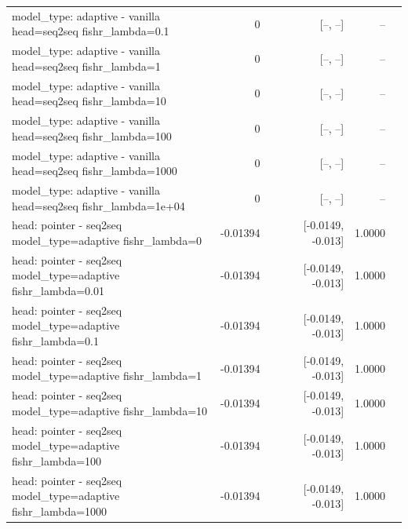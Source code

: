 \documentclass[10pt]{article}
\makeatletter
\newcommand{\stackcell}[1]{\begin{tabular}[t]{@{}l@{}}#1\end{tabular}}
\makeatother
\begin{document}
{\begin{longtable}{lrrrl}
\stackcell{model\_type: adaptive - vanilla\\\footnotesize head=seq2seq fishr\_lambda=0.1 } & 0 & [--, --] & -- & \\
\stackcell{model\_type: adaptive - vanilla\\\footnotesize head=seq2seq fishr\_lambda=1 } & 0 & [--, --] & -- & \\
\stackcell{model\_type: adaptive - vanilla\\\footnotesize head=seq2seq fishr\_lambda=10 } & 0 & [--, --] & -- & \\
\stackcell{model\_type: adaptive - vanilla\\\footnotesize head=seq2seq fishr\_lambda=100 } & 0 & [--, --] & -- & \\
\stackcell{model\_type: adaptive - vanilla\\\footnotesize head=seq2seq fishr\_lambda=1000 } & 0 & [--, --] & -- & \\
\stackcell{model\_type: adaptive - vanilla\\\footnotesize head=seq2seq fishr\_lambda=1e+04 } & 0 & [--, --] & -- & \\
\stackcell{head: pointer - seq2seq\\\footnotesize model\_type=adaptive fishr\_lambda=0 } & -0.01394 & [-0.0149, -0.013] & 1.0000 & \\
\stackcell{head: pointer - seq2seq\\\footnotesize model\_type=adaptive fishr\_lambda=0.01 } & -0.01394 & [-0.0149, -0.013] & 1.0000 & \\
\stackcell{head: pointer - seq2seq\\\footnotesize model\_type=adaptive fishr\_lambda=0.1 } & -0.01394 & [-0.0149, -0.013] & 1.0000 & \\
\stackcell{head: pointer - seq2seq\\\footnotesize model\_type=adaptive fishr\_lambda=1 } & -0.01394 & [-0.0149, -0.013] & 1.0000 & \\
\stackcell{head: pointer - seq2seq\\\footnotesize model\_type=adaptive fishr\_lambda=10 } & -0.01394 & [-0.0149, -0.013] & 1.0000 & \\
\stackcell{head: pointer - seq2seq\\\footnotesize model\_type=adaptive fishr\_lambda=100 } & -0.01394 & [-0.0149, -0.013] & 1.0000 & \\
\stackcell{head: pointer - seq2seq\\\footnotesize model\_type=adaptive fishr\_lambda=1000 } & -0.01394 & [-0.0149, -0.013] & 1.0000 & \\

\end{longtable}}
\end{document}

